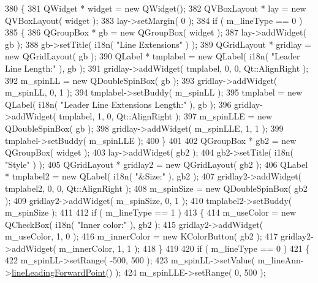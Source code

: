 \begin{DoxyCode}
380 \{
381     QWidget * widget = \textcolor{keyword}{new} QWidget();
382     QVBoxLayout * lay = \textcolor{keyword}{new} QVBoxLayout( widget );
383     lay->setMargin( 0 );
384     \textcolor{keywordflow}{if} ( m\_lineType == 0 )
385     \{
386         QGroupBox * gb = \textcolor{keyword}{new} QGroupBox( widget );
387         lay->addWidget( gb );
388         gb->setTitle( i18n( \textcolor{stringliteral}{"Line Extensions"} ) );
389         QGridLayout * gridlay = \textcolor{keyword}{new} QGridLayout( gb );
390         QLabel * tmplabel = \textcolor{keyword}{new} QLabel( i18n( \textcolor{stringliteral}{"Leader Line Length:"} ), gb );
391         gridlay->addWidget( tmplabel, 0, 0, Qt::AlignRight );
392         m\_spinLL = \textcolor{keyword}{new} QDoubleSpinBox( gb );
393         gridlay->addWidget( m\_spinLL, 0, 1 );
394         tmplabel->setBuddy( m\_spinLL );
395         tmplabel = \textcolor{keyword}{new} QLabel( i18n( \textcolor{stringliteral}{"Leader Line Extensions Length:"} ), gb );
396         gridlay->addWidget( tmplabel, 1, 0, Qt::AlignRight );
397         m\_spinLLE = \textcolor{keyword}{new} QDoubleSpinBox( gb );
398         gridlay->addWidget( m\_spinLLE, 1, 1 );
399         tmplabel->setBuddy( m\_spinLLE );
400     \}
401 
402     QGroupBox * gb2 = \textcolor{keyword}{new} QGroupBox( widget );
403     lay->addWidget( gb2 );
404     gb2->setTitle( i18n( \textcolor{stringliteral}{"Style"} ) );
405     QGridLayout * gridlay2 = \textcolor{keyword}{new} QGridLayout( gb2 );
406     QLabel * tmplabel2 = \textcolor{keyword}{new} QLabel( i18n( \textcolor{stringliteral}{"&Size:"} ), gb2 );
407     gridlay2->addWidget( tmplabel2, 0, 0, Qt::AlignRight );
408     m\_spinSize = \textcolor{keyword}{new} QDoubleSpinBox( gb2 );
409     gridlay2->addWidget( m\_spinSize, 0, 1 );
410     tmplabel2->setBuddy( m\_spinSize );
411 
412     \textcolor{keywordflow}{if} ( m\_lineType == 1 )
413     \{
414         m\_useColor = \textcolor{keyword}{new} QCheckBox( i18n( \textcolor{stringliteral}{"Inner color:"} ), gb2 );
415         gridlay2->addWidget( m\_useColor, 1, 0 );
416         m\_innerColor = \textcolor{keyword}{new} KColorButton( gb2 );
417         gridlay2->addWidget( m\_innerColor, 1, 1 );
418     \}
419 
420     \textcolor{keywordflow}{if} ( m\_lineType == 0 )
421     \{
422         m\_spinLL->setRange( -500, 500 );
423         m\_spinLL->setValue( m\_lineAnn->\hyperlink{classOkular_1_1LineAnnotation_a5ea35b2ee68172d9cf183d8778e34edb}{lineLeadingForwardPoint}() );
424         m\_spinLLE->setRange( 0, 500 );

\end{DoxyCode}
